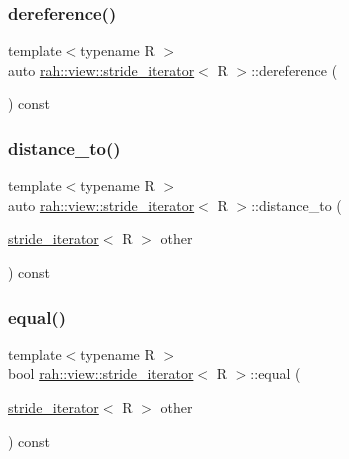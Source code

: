 \subsubsection{\texorpdfstring{dereference()}{dereference()}}
{\footnotesize\ttfamily template$<$typename R $>$ \\
auto \mbox{\hyperlink{structrah_1_1view_1_1stride__iterator}{rah\+::view\+::stride\+\_\+iterator}}$<$ R $>$\+::dereference (\begin{DoxyParamCaption}{ }\end{DoxyParamCaption}) const\hspace{0.3cm}{\ttfamily [inline]}}

\mbox{\label{structrah_1_1view_1_1stride__iterator_ad30be3983aec3fab52efb32a1a461056}} 
\subsubsection{\texorpdfstring{distance\_to()}{distance\_to()}}
{\footnotesize\ttfamily template$<$typename R $>$ \\
auto \mbox{\hyperlink{structrah_1_1view_1_1stride__iterator}{rah\+::view\+::stride\+\_\+iterator}}$<$ R $>$\+::distance\+\_\+to (\begin{DoxyParamCaption}\item[{\mbox{\hyperlink{structrah_1_1view_1_1stride__iterator}{stride\+\_\+iterator}}$<$ R $>$}]{other }\end{DoxyParamCaption}) const\hspace{0.3cm}{\ttfamily [inline]}}

\mbox{\label{structrah_1_1view_1_1stride__iterator_a34c24e935ee7beebcd7269ee314e245a}} 
\subsubsection{\texorpdfstring{equal()}{equal()}}
{\footnotesize\ttfamily template$<$typename R $>$ \\
bool \mbox{\hyperlink{structrah_1_1view_1_1stride__iterator}{rah\+::view\+::stride\+\_\+iterator}}$<$ R $>$\+::equal (\begin{DoxyParamCaption}\item[{\mbox{\hyperlink{structrah_1_1view_1_1stride__iterator}{stride\+\_\+iterator}}$<$ R $>$}]{other }\end{DoxyParamCaption}) const\hspace{0.3cm}{\ttfamily [inline]}}

